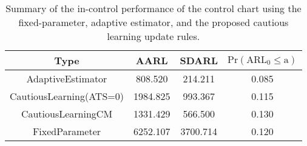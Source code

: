 \begin{table}[!h]

\caption{Summary of the in-control performance of the control chart using the fixed-parameter, adaptive estimator, and the proposed cautious learning update rules.}
\centering
\begin{tabular}[t]{cccc}
\toprule
Type & AARL & SDARL & $\text{Pr}(\text{ARL}_0 \leq \text{a})$\\
\midrule
AdaptiveEstimator & 808.520 & 214.211 & 0.085\\
CautiousLearning(ATS=0) & 1984.825 & 993.367 & 0.115\\
CautiousLearningCM & 1331.429 & 566.500 & 0.130\\
FixedParameter & 6252.107 & 3700.714 & 0.120\\
\bottomrule
\end{tabular}
\end{table}
